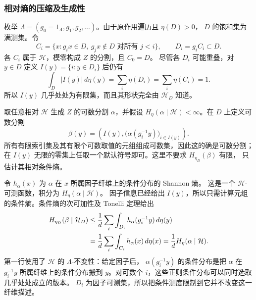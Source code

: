 \documentclass[UTF8,zihao=-4,a4paper]{ctexart}
\numberwithin{equation}{section}
\begin{document}
\subsubsection{相对熵的压缩及生成性}\label{b2:compression}

枚举 $\Lambda=(g_0=1_\Lambda,g_1,g_2,\ldots)$。由于原作用遍历且 $\eta(D)>0$，
$D$ 的饱和集为满测集。令
\begin{equation}\label{b2:firsthit}
 C_i=\{x:g_ix\in D,\ g_jx\notin D\text{ 对所有 }j<i\},\qquad
 D_i=g_iC_i\subset D.
\end{equation}
各 $C_i$ 属于 $\mathcal H$，模零构成 $Z$ 的分割，且 $C_0=D$。
尽管各 $D_i$ 可能重叠，对 $y\in D$ 定义
$I(y)=\{i:y\in D_i\}$ 后仍有
\begin{equation}\label{b2:finiteindex}
 \int_D|I(y)|\,d\eta(y)
 =\sum_i\eta(D_i)=\sum_i\eta(C_i)=1.
\end{equation}
所以 $I(y)$ 几乎处处为有限集，而且其形状完全由 $\mathcal H_D$ 知道。

取任意相对 $\mathcal H$ 生成 $Z$ 的可数分割 $\alpha$，并假设
$H_\eta(\alpha\mid\mathcal H)<\infty$。在 $D$ 上定义可数分割
\begin{equation}\label{b2:compressedpartition}
 \beta(y)=\left(I(y),\bigl(\alpha(g_i^{-1}y)\bigr)_{i\in I(y)}\right).
\end{equation}
所有有限索引集及其有限个可数取值的元组组成可数集，因此这的确是可数分割；
在 $I(y)$ 无限的零集上任取一个默认符号即可。这里不要求 $H_{\eta_D}(\beta)$ 有限，
只估计其相对条件熵。

令 $h_\alpha(x)$ 为 $\alpha$ 在 $x$ 所属因子纤维上的条件分布的 Shannon 熵。
这是一个 $\mathcal H$-可测函数，积分为 $H_\eta(\alpha\mid\mathcal H)$。
因子信息已经给出 $I(y)$，所以只需计算元组的条件熵。条件熵的次可加性及 Tonelli 定理给出
\begin{align}
 H_{\eta_D}(\beta\mid\mathcal H_D)
 &\le\frac1d\sum_i\int_{D_i}h_\alpha(g_i^{-1}y)\,d\eta(y)\notag\\
 &=\frac1d\sum_i\int_{C_i}h_\alpha(x)\,d\eta(x)
 =\frac1dH_\eta(\alpha\mid\mathcal H).
 \label{b2:entropycompression}
\end{align}
第一行使用了 $\mathcal H$ 的 $\Lambda$-不变性：给定因子后，
$\alpha(g_i^{-1}y)$ 的条件分布是把 $\alpha$ 在 $g_i^{-1}y$ 所属纤维上的条件分布搬到
$y$。对可数个 $i$，这些正则条件分布可以同时选取几乎处处成立的版本。
$D_i$ 为因子可测集，所以把条件测度限制到它并不改变这一纤维描述。
\end{document}

